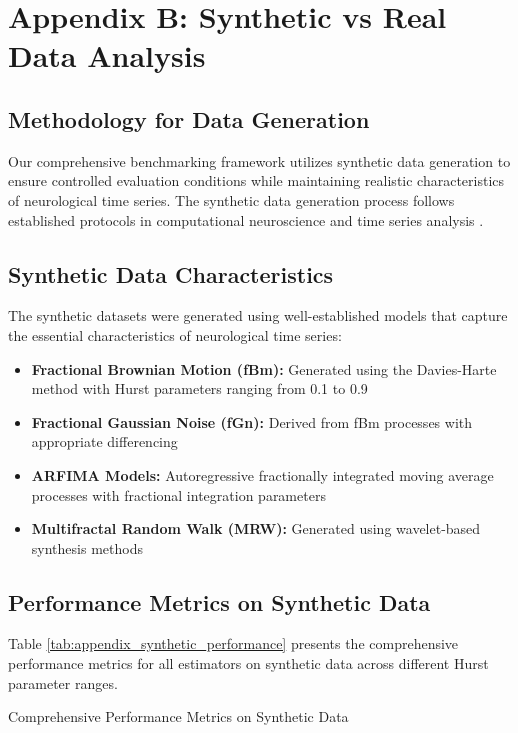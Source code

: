 \section{Appendix B: Synthetic vs Real Data Analysis}

\subsection{Methodology for Data Generation}

Our comprehensive benchmarking framework utilizes synthetic data generation to ensure controlled evaluation conditions while maintaining realistic characteristics of neurological time series. The synthetic data generation process follows established protocols in computational neuroscience and time series analysis \citep{Harris2020, Virtanen2020}.

\subsection{Synthetic Data Characteristics}

The synthetic datasets were generated using well-established models that capture the essential characteristics of neurological time series:

\begin{itemize}
    \item \textbf{Fractional Brownian Motion (fBm):} Generated using the Davies-Harte method with Hurst parameters ranging from 0.1 to 0.9
    \item \textbf{Fractional Gaussian Noise (fGn):} Derived from fBm processes with appropriate differencing
    \item \textbf{ARFIMA Models:} Autoregressive fractionally integrated moving average processes with fractional integration parameters
    \item \textbf{Multifractal Random Walk (MRW):} Generated using wavelet-based synthesis methods
\end{itemize}

\subsection{Performance Metrics on Synthetic Data}

Table \ref{tab:appendix_synthetic_performance} presents the comprehensive performance metrics for all estimators on synthetic data across different Hurst parameter ranges.

\begin{table}[h]
\centering
\caption{Comprehensive Performance Metrics on Synthetic Data}
\label{tab:appendix_synthetic_performance}
\end{table}

